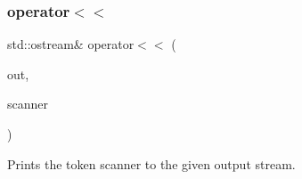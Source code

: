 \subsubsection{\texorpdfstring{operator$<$$<$}{operator<<}}
{\footnotesize\ttfamily std\+::ostream\& operator$<$$<$ (\begin{DoxyParamCaption}\item[{std\+::ostream \&}]{out,  }\item[{const \mbox{\hyperlink{classTokenScanner}{Token\+Scanner}} \&}]{scanner }\end{DoxyParamCaption})\hspace{0.3cm}{\ttfamily [friend]}}



Prints the token scanner to the given output stream. 

